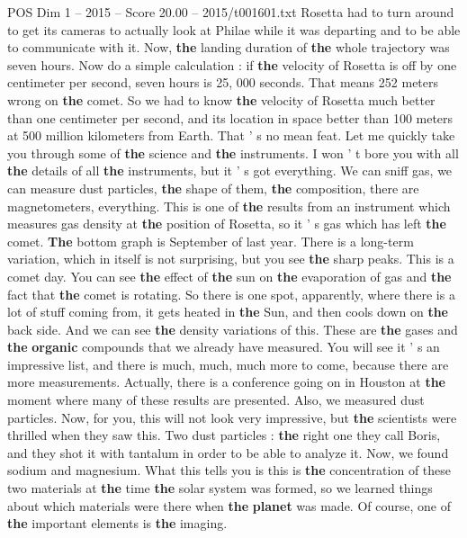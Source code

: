\begin{textsample}{POS Dim 1 – 2015 – Score 20.00 – 2015/t001601.txt}
Rosetta had to turn around to get its cameras to actually look at Philae while it was departing and to be able to communicate with it.
Now, \textbf{the} landing duration of \textbf{the} whole trajectory was seven hours.
Now do a simple calculation : if \textbf{the} velocity of Rosetta is off by one centimeter per second, seven hours is 25, 000 seconds.
That means 252 meters wrong on \textbf{the} comet.
So we had to know \textbf{the} velocity of Rosetta much better than one centimeter per second, and its location in space better than 100 meters at 500 million kilometers from Earth.
That ' s no mean feat.
Let me quickly take you through some of \textbf{the} science and \textbf{the} instruments.
I won ' t bore you with all \textbf{the} details of all \textbf{the} instruments, but it ' s got everything.
We can sniff gas, we can measure dust particles, \textbf{the} shape of them, \textbf{the} composition, there are magnetometers, everything.
This is one of \textbf{the} results from an instrument which measures gas density at \textbf{the} position of Rosetta, so it ' s gas which has left \textbf{the} comet. \textbf{The} bottom graph is September of last year.
There is a long-term variation, which in itself is not surprising, but you see \textbf{the} sharp peaks.
This is a comet day.
You can see \textbf{the} effect of \textbf{the} sun on \textbf{the} evaporation of gas and \textbf{the} fact that \textbf{the} comet is rotating.
So there is one spot, apparently, where there is a lot of stuff coming from, it gets heated in \textbf{the} Sun, and then cools down on \textbf{the} back side.
And we can see \textbf{the} density variations of this.
These are \textbf{the} gases and \textbf{the} \textbf{organic} compounds that we already have measured.
You will see it ' s an impressive list, and there is much, much, much more to come, because there are more measurements.
Actually, there is a conference going on in Houston at \textbf{the} moment where many of these results are presented.
Also, we measured dust particles.
Now, for you, this will not look very impressive, but \textbf{the} scientists were thrilled when they saw this.
Two dust particles : \textbf{the} right one they call Boris, and they shot it with tantalum in order to be able to analyze it.
Now, we found sodium and magnesium.
What this tells you is this is \textbf{the} concentration of these two materials at \textbf{the} time \textbf{the} solar system was formed, so we learned things about which materials were there when \textbf{the} \textbf{planet} was made.
Of course, one of \textbf{the} important elements is \textbf{the} imaging.

\end{textsample}
